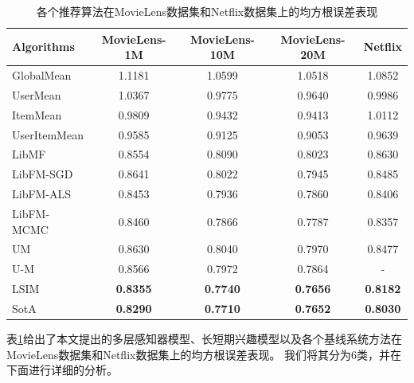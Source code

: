 \begin{table}[htbp]
    \centering
    \caption{各个推荐算法在MovieLens数据集和Netflix数据集上的均方根误差表现}
    \label{tab:msre}
    \begin{tabular}{|l|c|c|c|c|}
        \hline
        \textbf{Algorithms} & \textbf{MovieLens-1M} & \textbf{MovieLens-10M} & \textbf{MovieLens-20M} & \textbf{Netflix} \\
        \hline
        GlobalMean   & 1.1181          & 1.0599          & 1.0518          & 1.0852          \\
        UserMean     & 1.0367          & 0.9775          & 0.9640          & 0.9986          \\
        ItemMean     & 0.9809          & 0.9432          & 0.9413          & 1.0112          \\
        UserItemMean & 0.9585          & 0.9125          & 0.9053          & 0.9639          \\
        \hline
        LibMF        & 0.8554          & 0.8090          & 0.8023          & 0.8630          \\
        \hline
        LibFM-SGD    & 0.8641          & 0.8022          & 0.7945          & 0.8485          \\
        LibFM-ALS    & 0.8453          & 0.7936          & 0.7860          & 0.8406          \\
        LibFM-MCMC   & 0.8460          & 0.7866          & 0.7787          & 0.8357          \\
        \hline
        UM           & 0.8630          & 0.8040          & 0.7970          & 0.8477          \\
        U-M          & 0.8566          & 0.7972          & 0.7864          & -               \\
        \hline
        LSIM         & \textbf{0.8355} & \textbf{0.7740} & \textbf{0.7656} & \textbf{0.8182} \\
        \hline
        SotA         & \textbf{0.8290} & \textbf{0.7710} & \textbf{0.7652} & \textbf{0.8030} \\
        \hline
    \end{tabular}
\end{table}

表\ref{tab:msre}给出了本文提出的多层感知器模型、长短期兴趣模型以及各个基线系统方法在MovieLens数据集和Netflix数据集上的均方根误差表现。
我们将其分为$6$类，并在下面进行详细的分析。

